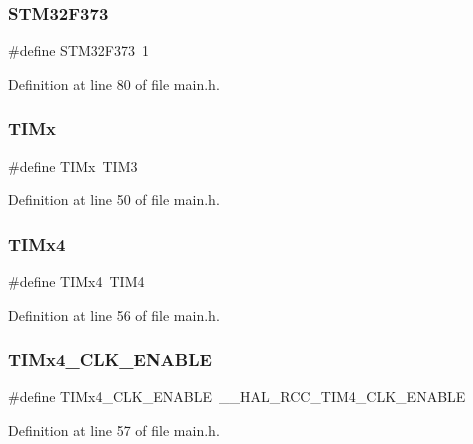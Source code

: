 \subsubsection{S\+T\+M32\+F373}
{\footnotesize\ttfamily \#define S\+T\+M32\+F373~1}



Definition at line 80 of file main.\+h.

\mbox{\label{main_8h_a25d69bed0692e5f9388fbf3df864e075}} 
\subsubsection{T\+I\+Mx}
{\footnotesize\ttfamily \#define T\+I\+Mx~T\+I\+M3}



Definition at line 50 of file main.\+h.

\mbox{\label{main_8h_a27a36d72781c16d4222884d7731e54db}} 
\subsubsection{T\+I\+Mx4}
{\footnotesize\ttfamily \#define T\+I\+Mx4~T\+I\+M4}



Definition at line 56 of file main.\+h.

\mbox{\label{main_8h_a1dde441d30c280d2b333aa12fcad1b51}} 
\subsubsection{T\+I\+Mx4\+\_\+\+C\+L\+K\+\_\+\+E\+N\+A\+B\+LE}
{\footnotesize\ttfamily \#define T\+I\+Mx4\+\_\+\+C\+L\+K\+\_\+\+E\+N\+A\+B\+LE~\+\_\+\+\_\+\+H\+A\+L\+\_\+\+R\+C\+C\+\_\+\+T\+I\+M4\+\_\+\+C\+L\+K\+\_\+\+E\+N\+A\+B\+LE}



Definition at line 57 of file main.\+h.

\mbox{\label{main_8h_aa3c91d4b3ae05c651dba0482938200f2}} 
